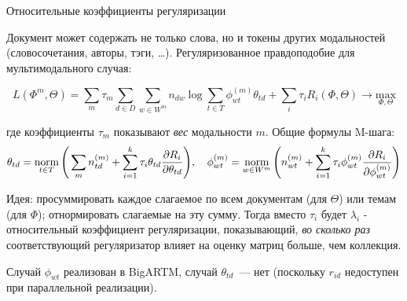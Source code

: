 \begin{frame}[t]{Относительные коэффициенты регуляризации}
\footnotesize

Документ может содержать не только слова, но и токены других модальностей (словосочетания, авторы, тэги, \dots).
Регуляризованное правдоподобие для мультимодального случая:

\[
L(\Phi^m, \Theta) = \sum_m \tau_m \sum_{d\in D} \sum_{w \in W^m} n_{dw} \log \sum_{t \in T} \phi_{wt}^{(m)} \theta_{td}
+
\sum_{i} \tau_i R_i(\Phi, \Theta)
\rightarrow \underset{\Phi, \Theta}{\mathrm{max}}
\]

где коэффициенты $\tau_m$ показывают \textit{вес} модальности $m$. Общие формулы M-шага:
\[
\theta_{td} = \mathop{\mathrm{norm}}\limits_{t \in T} \Bigg(
    \sum_m n_{td}^{(m)} + \sum_{i=1}^k \tau_i \theta_{td} \frac{\partial R_i}{\partial \theta_{td}}
\Bigg), \quad \phi_{wt}^{(m)} = \mathop{\mathrm{norm}}\limits_{w \in W^m}\Bigg(
    n_{wt}^{(m)} + \sum_{i=1}^k \tau_i 
    \phi_{wt}^{(m)} \frac{\partial R_i}{\partial \phi_{wt}^{(m)}}
\Bigg)
\]

\medskip
Идея: просуммировать каждое слагаемое по всем документам (для $\Theta$) или темам (для $\Phi$); отнормировать слагаемые на эту сумму. Тогда вместо $\tau_i$ будет  $\lambda_i$ - относительный коэффициент регуляризации, показывающий, \emph{во сколько раз} соответствующий регуляризатор влияет на оценку матриц больше, чем коллекция.

Случай $\phi_{wt}$ реализован в BigARTM, случай $\theta_{td}$~--- нет (поскольку $r_{id}$ недоступен при параллельной реализации).

\normalsize
\end{frame}

